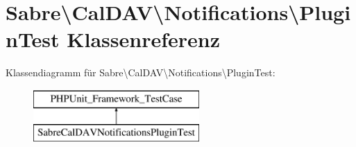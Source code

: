 \hypertarget{class_sabre_1_1_cal_d_a_v_1_1_notifications_1_1_plugin_test}{}\section{Sabre\textbackslash{}Cal\+D\+AV\textbackslash{}Notifications\textbackslash{}Plugin\+Test Klassenreferenz}
\label{class_sabre_1_1_cal_d_a_v_1_1_notifications_1_1_plugin_test}
Klassendiagramm für Sabre\textbackslash{}Cal\+D\+AV\textbackslash{}Notifications\textbackslash{}Plugin\+Test\+:\begin{figure}[H]
\begin{center}
\leavevmode
\includegraphics[height=2.000000cm]{class_sabre_1_1_cal_d_a_v_1_1_notifications_1_1_plugin_test}
\end{center}
\end{figure}
